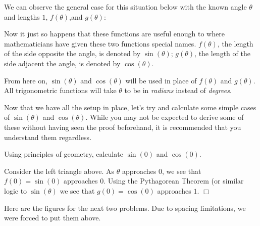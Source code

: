 \documentclass[../book.tex]{subfiles}
\begin{document}
We can observe the general case for this situation below with the known angle $\theta$ and lengths $1$, $f(\theta)$,and $g(\theta)$: \newpage
\begin{figure}
    \centering
\end{figure}
Now it just so happens that these functions are useful enough to where mathematicians have given these two functions special names. $f(\theta)$, the length of the side opposite the angle, is denoted by $\sin(\theta)$; $g(\theta)$, the length of the side adjacent the angle, is denoted by $\cos(\theta)$.
\begin{note}
From here on, $\sin(\theta)$ and $\cos(\theta)$ will be used in place of $f(\theta)$ and $g(\theta)$.  All trigonometric functions will take $\theta$ to be in \textit{radians} instead of \textit{degrees}.
\end{note}
Now that we have all the setup in place, let's try and calculate some simple cases of $\sin(\theta)$ and $\cos(\theta)$. While you may not be expected to derive some of these without having seen the proof beforehand, it is recommended that you understand them regardless.
\begin{example}
Using principles of geometry, calculate $\sin(0)$ and $\cos(0)$.
\end{example}
\begin{solution}
Consider the left triangle above.  As $\theta$ approaches $0$, we see that $f(0)=\sin(0)$ approaches $0$. Using the Pythagorean Theorem (or similar logic to $\sin(\theta)$ we see that $g(0)=\cos(0)$ approaches $1$. $\Box$
\end{solution}
Here are the figures for the next two problems.  Due to spacing limitations, we were forced to put them above.
\end{document}
